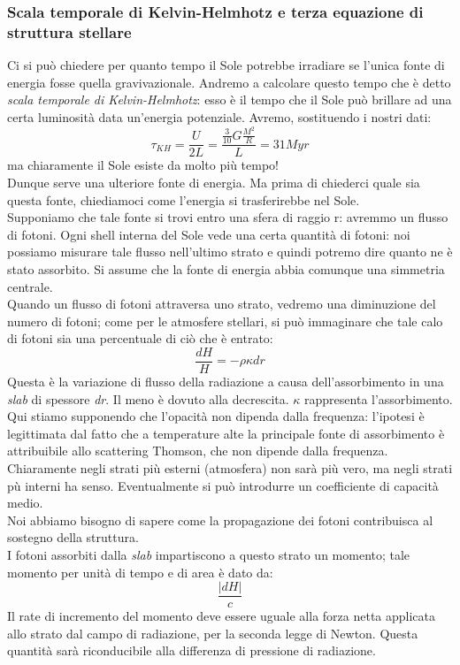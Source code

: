 \documentclass[a4paper,11pt]{article}
\begin{document}
\subsubsection{Scala temporale di Kelvin-Helmhotz e terza equazione di struttura stellare}
Ci si può chiedere per quanto tempo il Sole potrebbe irradiare se l'unica fonte di energia fosse quella gravivazionale. Andremo a calcolare questo tempo che è detto \textit{scala temporale di Kelvin-Helmhotz}: esso è il tempo che il  Sole può brillare ad una certa luminosità data un'energia potenziale. Avremo, sostituendo i nostri dati:
$$\tau_{KH}=\frac{U}{2L}=\frac{\frac{3}{10}G\frac{M^2}{R}}{L}=31Myr$$
ma chiaramente il Sole esiste da molto più tempo!\\
Dunque serve una ulteriore fonte di energia. Ma prima di chiederci quale sia questa fonte, chiediamoci come l'energia si trasferirebbe nel Sole.\\
Supponiamo che tale fonte si trovi entro una sfera di raggio r: avremmo un flusso di fotoni. Ogni shell interna del Sole vede una certa quantità di fotoni: noi possiamo misurare tale flusso nell'ultimo strato e quindi potremo dire quanto ne è stato assorbito. Si assume che la fonte di energia abbia comunque una simmetria centrale.\\
Quando un flusso di fotoni attraversa uno strato, vedremo una diminuzione del numero di fotoni; come per le atmosfere stellari, si può immaginare che tale calo di fotoni sia una percentuale di ciò che è entrato:
$$\frac{dH}{H}=-\rho\kappa dr$$
Questa è la variazione di flusso della radiazione a causa dell'assorbimento in una \textit{slab} di spessore \textit{dr}. Il meno è dovuto alla decrescita. $\kappa$ rappresenta l'assorbimento.\\
Qui stiamo supponendo che l'opacità non dipenda dalla frequenza: l'ipotesi è legittimata dal fatto che a temperature alte la principale fonte di assorbimento è attribuibile allo scattering Thomson, che non dipende dalla frequenza. Chiaramente negli strati più esterni (atmosfera) non sarà più vero, ma negli strati pù interni ha senso. Eventualmente si può introdurre un coefficiente di capacità medio.\\
Noi abbiamo bisogno di sapere come la propagazione dei fotoni contribuisca al sostegno della struttura.\\
I fotoni assorbiti dalla \textit{slab} impartiscono a questo strato un momento; tale momento per unità di tempo e di area è dato da:
$$\frac{|dH|}{c}$$
Il rate di incremento del momento deve essere uguale alla forza netta applicata allo strato dal campo di radiazione, per la seconda legge di Newton. Questa quantità sarà riconducibile alla differenza di pressione di radiazione.
\end{document}
